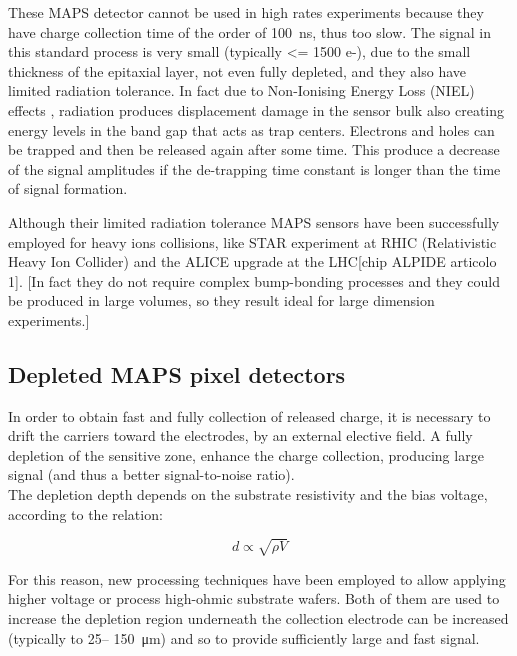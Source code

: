 These MAPS detector cannot be used in high rates experiments because they have charge collection time of the order of \SI{100}{ns}, thus too slow. The signal in this standard process is very small (typically <= 1500 e-), due to the small thickness of the epitaxial layer, not even fully depleted, and they also have limited radiation tolerance. 
In fact due to Non-Ionising Energy Loss (NIEL) effects \cite{wermes_book2020}, radiation produces displacement damage in the sensor bulk also creating energy levels in the band gap that acts as trap centers. 
Electrons and holes can be trapped and then be released again after some time. This produce a decrease of the signal amplitudes if the de-trapping time constant is longer than the time of signal formation. 

Although their limited radiation tolerance MAPS sensors have been successfully employed for heavy ions collisions, like STAR experiment at RHIC (Relativistic Heavy Ion Collider) and the ALICE upgrade at the LHC[chip ALPIDE articolo 1]. [In fact they do not require complex bump-bonding processes and they could be produced in large volumes, so they result ideal for large dimension experiments.]



\subsection{Depleted MAPS pixel detectors}

In order to obtain fast and fully collection of released charge, it is necessary to drift the carriers toward the electrodes, by an external elective field. A fully depletion of the sensitive zone, enhance the charge collection, producing large signal (and thus a better signal-to-noise ratio). \\
The depletion depth depends on the substrate resistivity and the bias voltage, according to the relation:

\begin{equation}
d \propto \sqrt{\rho V}
\end{equation}

For this reason, new processing techniques have been employed to allow applying higher voltage or process high-ohmic substrate wafers. Both of them are used to increase the depletion region underneath the collection electrode can be increased (typically to 25– \SI{150}{\micro m}) and so to provide sufficiently large and fast signal.



